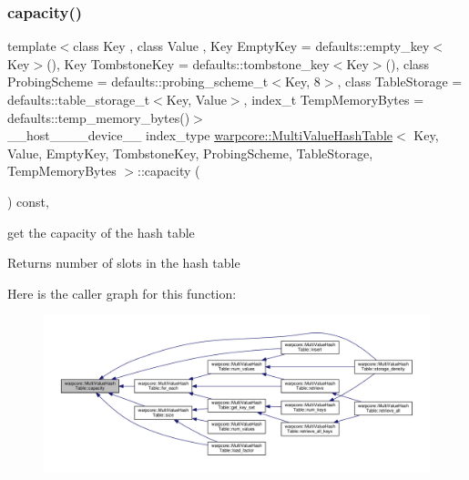 \subsubsection{\texorpdfstring{capacity()}{capacity()}}
{\footnotesize\ttfamily template$<$class Key , class Value , Key Empty\+Key = defaults\+::empty\+\_\+key$<$\+Key$>$(), Key Tombstone\+Key = defaults\+::tombstone\+\_\+key$<$\+Key$>$(), class Probing\+Scheme  = defaults\+::probing\+\_\+scheme\+\_\+t$<$\+Key, 8$>$, class Table\+Storage  = defaults\+::table\+\_\+storage\+\_\+t$<$\+Key, Value$>$, index\+\_\+t Temp\+Memory\+Bytes = defaults\+::temp\+\_\+memory\+\_\+bytes()$>$ \\
\+\_\+\+\_\+host\+\_\+\+\_\+\+\_\+\+\_\+device\+\_\+\+\_\+ index\+\_\+type \hyperlink{classwarpcore_1_1MultiValueHashTable}{warpcore\+::\+Multi\+Value\+Hash\+Table}$<$ Key, Value, Empty\+Key, Tombstone\+Key, Probing\+Scheme, Table\+Storage, Temp\+Memory\+Bytes $>$\+::capacity (\begin{DoxyParamCaption}{ }\end{DoxyParamCaption}) const\hspace{0.3cm}{\ttfamily [inline]}, {\ttfamily [noexcept]}}



get the capacity of the hash table 

\begin{DoxyReturn}{Returns}
number of slots in the hash table 
\end{DoxyReturn}
Here is the caller graph for this function\+:
\nopagebreak
\begin{figure}[H]
\begin{center}
\leavevmode
\includegraphics[width=350pt]{classwarpcore_1_1MultiValueHashTable_ae4ceca02c7bd32ee58171b5aa1ee47ff_icgraph}
\end{center}
\end{figure}
\mbox{\label{classwarpcore_1_1MultiValueHashTable_ad300c5a01bd933343ff08176fb4b4e29}} 
